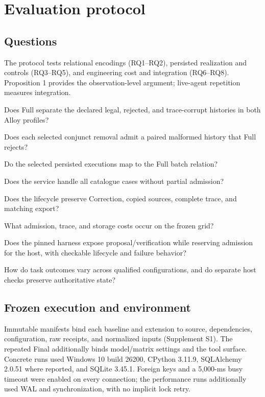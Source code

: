 \section{Evaluation protocol}
\label{sec:evaluation}

\subsection{Questions}

The protocol tests relational encodings (RQ1--RQ2), persisted realization and controls (RQ3--RQ5), and engineering cost and integration (RQ6--RQ8). Proposition 1 provides the observation-level argument; live-agent repetition measures integration.
\begin{description}[leftmargin=2.6em,labelwidth=2.1em]
\item[RQ1] Does Full separate the declared legal, rejected, and trace-corrupt histories in both Alloy profiles?
\item[RQ2] Does each selected conjunct removal admit a paired malformed history that Full rejects?
\item[RQ3] Do the selected persisted executions map to the Full batch relation?
\item[RQ4] Does the service handle all catalogue cases without partial admission?
\item[RQ5] Does the lifecycle preserve Correction, copied sources, complete trace, and matching export?
\item[RQ6] What admission, trace, and storage costs occur on the frozen grid?
\item[RQ7] Does the pinned harness expose proposal/verification while reserving admission for the host, with checkable lifecycle and failure behavior?
\item[RQ8] How do task outcomes vary across qualified configurations, and do separate host checks preserve authoritative state?
\end{description}

\subsection{Frozen execution and environment}

Immutable manifests bind each baseline and extension to source, dependencies, configuration, raw receipts, and normalized inputs (Supplement S1). The repeated Final additionally binds model/matrix settings and the tool surface. Concrete runs used Windows 10 build 26200, CPython 3.11.9, SQLAlchemy 2.0.51 where reported, and SQLite 3.45.1. Foreign keys and a 5,000-ms busy timeout were enabled on every connection; the performance runs additionally used WAL and  synchronization, with no implicit lock retry.


